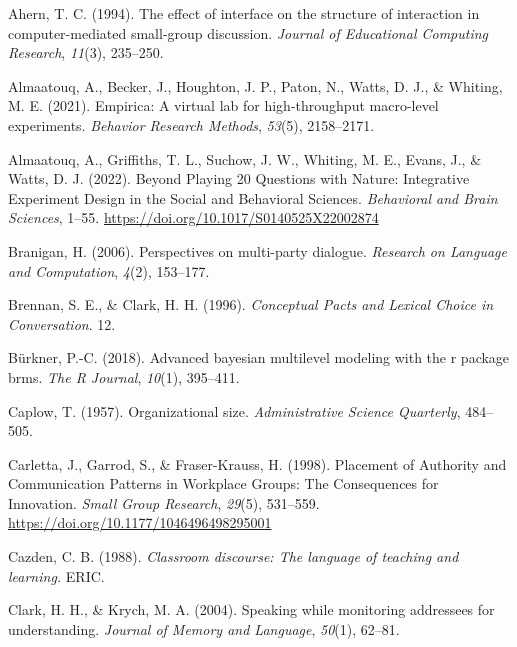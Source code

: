 \documentclass[
  english,
]{article}
\newlength{\cslhangindent}
\newenvironment{CSLReferences}[2] %
{\begin{list}{}{%
			\setlength{\itemindent}{0pt}
			\setlength{\leftmargin}{0pt}
			\setlength{\parsep}{0pt}
			\ifodd #1
			\setlength{\leftmargin}{\cslhangindent}
			\setlength{\itemindent}{-1\cslhangindent}
			\fi
			\setlength{\itemsep}{#2\baselineskip}}}
	{\end{list}}
\begin{document}
\label{refs}
\begin{CSLReferences}{1}{0}
Ahern, T. C. (1994). The effect of interface on the structure of interaction in computer-mediated small-group discussion. \emph{Journal of Educational Computing Research}, \emph{11}(3), 235--250.

Almaatouq, A., Becker, J., Houghton, J. P., Paton, N., Watts, D. J., \& Whiting, M. E. (2021). Empirica: A virtual lab for high-throughput macro-level experiments. \emph{Behavior Research Methods}, \emph{53}(5), 2158--2171.

Almaatouq, A., Griffiths, T. L., Suchow, J. W., Whiting, M. E., Evans, J., \& Watts, D. J. (2022). Beyond {Playing} 20 {Questions} with {Nature}: {Integrative Experiment Design} in the {Social} and {Behavioral Sciences}. \emph{Behavioral and Brain Sciences}, 1--55. \url{https://doi.org/10.1017/S0140525X22002874}

Branigan, H. (2006). Perspectives on multi-party dialogue. \emph{Research on Language and Computation}, \emph{4}(2), 153--177.

Brennan, S. E., \& Clark, H. H. (1996). \emph{Conceptual {Pacts} and {Lexical Choice} in {Conversation}}. 12.

Bürkner, P.-C. (2018). Advanced bayesian multilevel modeling with the r package brms. \emph{The R Journal}, \emph{10}(1), 395--411.

Caplow, T. (1957). Organizational size. \emph{Administrative Science Quarterly}, 484--505.

Carletta, J., Garrod, S., \& Fraser-Krauss, H. (1998). Placement of {Authority} and {Communication Patterns} in {Workplace Groups}: {The Consequences} for {Innovation}. \emph{Small Group Research}, \emph{29}(5), 531--559. \url{https://doi.org/10.1177/1046496498295001}

Cazden, C. B. (1988). \emph{Classroom discourse: The language of teaching and learning.} ERIC.

Clark, H. H., \& Krych, M. A. (2004). Speaking while monitoring addressees for understanding. \emph{Journal of Memory and Language}, \emph{50}(1), 62--81.


\end{CSLReferences}
\end{document}
